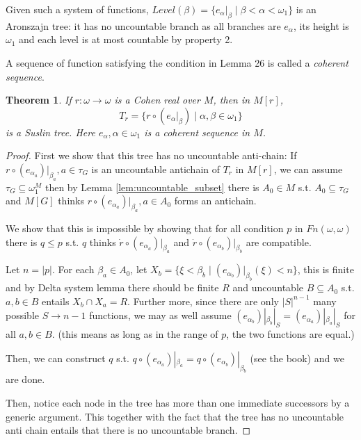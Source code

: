 \documentclass{article}
\newtheorem{theorem}{Theorem}
\begin{document}
Given such a system of functions, $Level(\beta) = \{e_\alpha|_\beta\mid \beta<\alpha<\omega_1\}$ is an Aronszajn tree: it has no uncountable branch as all branches are $e_\alpha$, its height is $\omega_1$ and each level is at most countable by property 2.

A sequence of function satisfying the condition in Lemma 26 is called a \textit{coherent sequence}.

\begin{theorem}
    If $r:\omega\to \omega$ is a Cohen real over $M$, then in $M[r]$, $$T_r = \{r\circ (e_\alpha|_\beta)\mid \alpha,\beta\in \omega_1\}$$ is a Suslin tree. Here $e_\alpha,\alpha\in \omega_1$ is a coherent sequence in $M$.
\end{theorem}

\begin{proof}
    First we show that this tree has no uncountable anti-chain: If $r\circ (e_{\alpha_a})|_{\beta_a},a\in \tau_G$ is an uncountable antichain of $T_r$ in $M[r]$, we can assume $\tau_G\subseteq \omega_1^M$ then by Lemma \ref{lem:uncountable_subset} there is $A_0\in M$ s.t. $A_0\subseteq \tau_G$ and $M[G]$ thinks $r\circ (e_{\alpha_a})|_{\beta_a},a\in A_0$ forms an antichain.

    We show that this is impossible by showing that for all condition $p$ in $Fn(\omega,\omega)$ there is $q\leq p$ s.t. $q$ thinks $\dot{r}\circ (e_{\alpha_a})|_{\beta_a}$ and $\dot{r}\circ (e_{\alpha_b})|_{\beta_b}$ are compatible.

    Let $n = |p|$.  For each $\beta_a\in A_0$, let $X_b = \{\xi<\beta_b\mid  (e_{\alpha_b})|_{\beta_b}(\xi)<n \}$, this is finite and by Delta system lemma there should be finite $R$ and uncountable $B\subseteq A_0$ s.t. $a,b\in B$ entails $X_b\cap X_a = R$. Further more, since there are only $|S|^{n-1}$ many possible $S\to n-1$ functions, we may as well assume $(e_{\alpha_b})|_{\beta_b}|_S =  (e_{\alpha_a})|_{\beta_a}|_S$ for all $a,b\in B$. (this means as long as in the range of $p$, the two functions are equal.)

    Then, we can construct $q$ s.t. $q\circ (e_{\alpha_a})|_{\beta_a} = q\circ (e_{\alpha_b})|_{\beta_b}$ (see the book) and we are done.

    Then, notice each node in the tree has more than one immediate successors by a generic argument. This together with the fact that the tree has no uncountable anti chain entails that there is no uncountable branch.
\end{proof}
\end{document}
